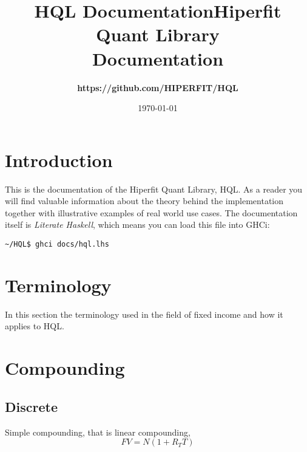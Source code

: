 \documentclass[11pt,a4paper]{article}
\def\Author{
\bf https://github.com/HIPERFIT/HQL
}
\def\Title{\bf Hiperfit Quant Library \\ Documentation}
\numberwithin{equation}{section}
\begin{document}
\title{HQL Documentation}

\title{\Title}
\author{\Author}
\date{\today}
\maketitle

\tableofcontents

\FrameSep

\section{Introduction}
This is the documentation of the Hiperfit Quant Library, HQL. As a reader you will
find valuable information about the theory behind the implementation together with
illustrative examples of real world use cases. The documentation itself is \textit{Literate Haskell}\cite{LitHaskell},
which means you can load this file into GHCi:

\FrameSep
\begin{lstlisting}
~/HQL$ ghci docs/hql.lhs
\end{lstlisting}

\section{Terminology}
In this section the terminology used in the field of fixed income and how it applies to HQL.


\section{Compounding}
\subsection{Discrete}
Simple compounding, that is linear compounding,
\[
FV = N(1+R_TT)
\]
\end{document}
